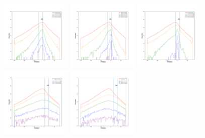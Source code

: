 \documentclass[12pt,prd]{article}
\begin{document}
\begin{figure}[h!]
\includegraphics[width=0.3\textwidth]{../figures/scanning_plotsgaiascan_l101_2_b58_4_ra212_7_dec55_2_npy_10.pdf}
\includegraphics[width=0.3\textwidth]{../figures/scanning_plotsgaiascan_l101_2_b58_4_ra212_7_dec55_2_npy_11.pdf}
\includegraphics[width=0.3\textwidth]{../figures/scanning_plotsgaiascan_l101_2_b58_4_ra212_7_dec55_2_npy_12.pdf}
\includegraphics[width=0.3\textwidth]{../figures/scanning_plotsgaiascan_l101_2_b58_4_ra212_7_dec55_2_npy_13.pdf}
\includegraphics[width=0.3\textwidth]{../figures/scanning_plotsgaiascan_l101_2_b58_4_ra212_7_dec55_2_npy_14.pdf}

\end{figure}
\end{document}
